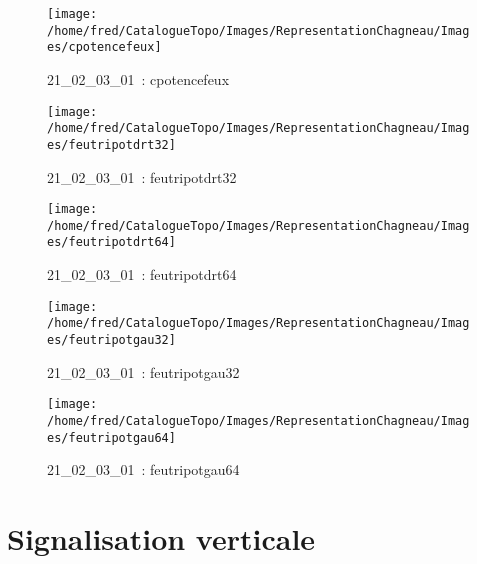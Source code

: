 \documentclass[12pt,titlepage]{book}
\begin{document}
\begin{figure}[h!]
  \begin{minipage}[t]{3cm}
    \begin{center}
      \texttt{[image: /home/fred/CatalogueTopo/Images/RepresentationChagneau/Images/cpotencefeux]}
      \caption[~21\_02\_03\_01]{\small{21\_02\_03\_01~:} \tiny{cpotencefeux}}\label{cpotencefeux}
    \end{center}
  \end{minipage}
  \begin{minipage}[t]{3cm}
    \begin{center}
      \texttt{[image: /home/fred/CatalogueTopo/Images/RepresentationChagneau/Images/feutripotdrt32]}
      \caption[~21\_02\_03\_01]{\small{21\_02\_03\_01~:} \tiny{feutripotdrt32}}\label{feutripotdrt32}
    \end{center}
  \end{minipage}
  \begin{minipage}[t]{3cm}
    \begin{center}
      \texttt{[image: /home/fred/CatalogueTopo/Images/RepresentationChagneau/Images/feutripotdrt64]}
      \caption[~21\_02\_03\_01]{\small{21\_02\_03\_01~:} \tiny{feutripotdrt64}}\label{feutripotdrt64}
    \end{center}
  \end{minipage}
  \begin{minipage}[t]{3cm}
    \begin{center}
      \texttt{[image: /home/fred/CatalogueTopo/Images/RepresentationChagneau/Images/feutripotgau32]}
      \caption[~21\_02\_03\_01]{\small{21\_02\_03\_01~:} \tiny{feutripotgau32}}\label{feutripotgau32}
    \end{center}
  \end{minipage}
  \begin{minipage}[t]{3cm}
    \begin{center}
      \texttt{[image: /home/fred/CatalogueTopo/Images/RepresentationChagneau/Images/feutripotgau64]}
      \caption[~21\_02\_03\_01]{\small{21\_02\_03\_01~:} \tiny{feutripotgau64}}\label{feutripotgau64}
    \end{center}
  \end{minipage}
\end{figure}
\chapter{Signalisation verticale}
\end{document}
